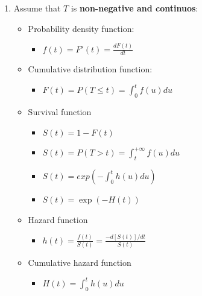 \documentclass[]{book}
\providecommand{\tightlist}{%
  \setlength{\itemsep}{0pt}\setlength{\parskip}{0pt}}
\theoremstyle{definition}
\theoremstyle{definition}
\theoremstyle{definition}
\theoremstyle{remark}
\begin{document}
\begin{enumerate}
\item
  Assume that \(T\) is \textbf{non-negative and continuos}:

  \begin{itemize}
  \item
    Probability density function:

    \begin{itemize}
    \tightlist
    \item
      \(f(t) = F'(t) = \frac{dF(t)}{dt}\)
    \end{itemize}
  \item
    Cumulative distribution function:

    \begin{itemize}
    \tightlist
    \item
      \(F(t) = P(T \le t) = \int_0^t{f(u)}{du}\)
    \end{itemize}
  \item
    Survival function

    \begin{itemize}
    \item
      \(S(t) = 1 - F(t)\)
    \item
      \(S(t) = P(T > t) = \int_t^{+\infty}{f(u)}{du}\)
    \item
      \(S(t) = exp \left( - \int_0^t h(u) du \right)\)
    \item
      \(S(t) = \exp(-H(t))\)
    \end{itemize}
  \item
    Hazard function

    \begin{itemize}
    \tightlist
    \item
      \(h(t) = \frac{ f(t)}{S(t)}= \frac{ -d[S(t)]/dt}{S(t)}\)
    \end{itemize}
  \item
    Cumulative hazard function

    \begin{itemize}
    \tightlist
    \item
      \(H(t) = \int_0^t h(u) du\)
    \end{itemize}
  \end{itemize}
\end{enumerate}
\end{document}

